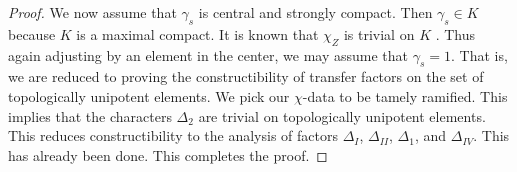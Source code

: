 \begin{proof}
We now assume that $\gamma_s$ is central and strongly compact.  Then
$\gamma_s\in K$ because $K$ is a maximal compact.  It is known that
$\chi_Z$ is trivial on $K$ \cite[Lemma
3.2]{hales1995fundamental}. Thus again adjusting by an element in the
center, we may assume that $\gamma_s=1$.  That is, we are reduced to
proving the constructibility of transfer factors on the set of
topologically unipotent elements.  We pick our $\chi$-data to be
tamely ramified.  This implies that the characters $\Delta_2$ are
trivial on topologically unipotent elements.  This reduces
constructibility to the analysis of factors $\Delta_I$, $\Delta_{II}$,
$\Delta_1$, and $\Delta_{IV}$.  This has already been done.  This
completes the proof.
\end{proof}


